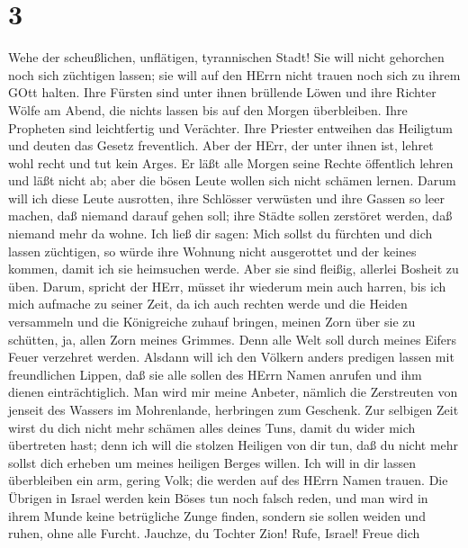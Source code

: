 \hypertarget{section-2}{%
\section{3}\label{section-2}}

 Wehe der scheußlichen, unflätigen, tyrannischen Stadt!
 Sie will nicht gehorchen noch sich züchtigen lassen; sie
will auf den HErrn nicht trauen noch sich zu ihrem GOtt halten.
 Ihre Fürsten sind unter ihnen brüllende Löwen und ihre
Richter Wölfe am Abend, die nichts lassen bis auf den Morgen
überbleiben.  Ihre Propheten sind leichtfertig und
Verächter. Ihre Priester entweihen das Heiligtum und deuten das Gesetz
freventlich.  Aber der HErr, der unter ihnen ist, lehret
wohl recht und tut kein Arges. Er läßt alle Morgen seine Rechte
öffentlich lehren und läßt nicht ab; aber die bösen Leute wollen sich
nicht schämen lernen.  Darum will ich diese Leute ausrotten,
ihre Schlösser verwüsten und ihre Gassen so leer machen, daß niemand
darauf gehen soll; ihre Städte sollen zerstöret werden, daß niemand mehr
da wohne.  Ich ließ dir sagen: Mich sollst du fürchten und
dich lassen züchtigen, so würde ihre Wohnung nicht ausgerottet und der
keines kommen, damit ich sie heimsuchen werde. Aber sie sind fleißig,
allerlei Bosheit zu üben.  Darum, spricht der HErr, müsset
ihr wiederum mein auch harren, bis ich mich aufmache zu seiner Zeit, da
ich auch rechten werde und die Heiden versammeln und die Königreiche
zuhauf bringen, meinen Zorn über sie zu schütten, ja, allen Zorn meines
Grimmes. Denn alle Welt soll durch meines Eifers Feuer verzehret werden.
 Alsdann will ich den Völkern anders predigen lassen mit
freundlichen Lippen, daß sie alle sollen des HErrn Namen anrufen und ihm
dienen einträchtiglich.  Man wird mir meine Anbeter,
nämlich die Zerstreuten von jenseit des Wassers im Mohrenlande,
herbringen zum Geschenk.  Zur selbigen Zeit wirst du dich
nicht mehr schämen alles deines Tuns, damit du wider mich übertreten
hast; denn ich will die stolzen Heiligen von dir tun, daß du nicht mehr
sollst dich erheben um meines heiligen Berges willen.  Ich
will in dir lassen überbleiben ein arm, gering Volk; die werden auf des
HErrn Namen trauen.  Die Übrigen in Israel werden kein
Böses tun noch falsch reden, und man wird in ihrem Munde keine
betrügliche Zunge finden, sondern sie sollen weiden und ruhen, ohne alle
Furcht.  Jauchze, du Tochter Zion! Rufe, Israel! Freue dich
